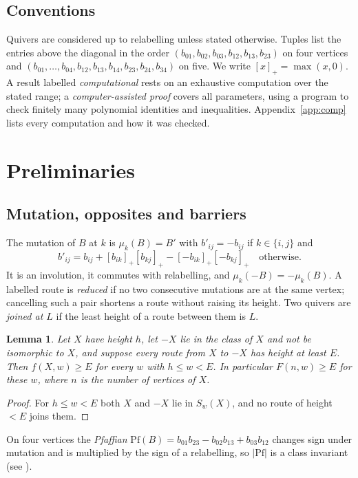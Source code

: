 \documentclass[11pt]{amsart}
\newtheorem{lemma}[theorem]{Lemma}
\theoremstyle{definition}
\theoremstyle{remark}
\newcommand{\pos}[1]{[#1]_+}
\begin{document}
\subsection{Conventions}\label{sec:conv}
Quivers are considered up to relabelling unless stated otherwise. Tuples list the entries above the diagonal in the order $(b_{01},b_{02},b_{03},b_{12},b_{13},b_{23})$ on four vertices and $(b_{01},\dots,b_{04},b_{12},b_{13},b_{14},b_{23},b_{24},b_{34})$ on five. We write $\pos{x}=\max(x,0)$. A result labelled \emph{computational} rests on an exhaustive computation over the stated range; a \emph{computer-assisted proof} covers all parameters, using a program to check finitely many polynomial identities and inequalities. Appendix~\ref{app:comp} lists every computation and how it was checked.

\section{Preliminaries}\label{sec:prelim}

\subsection{Mutation, opposites and barriers}
The mutation of $B$ at $k$ is $\mu_k(B)=B'$ with $b'_{ij}=-b_{ij}$ if $k\in\{i,j\}$ and
\[b'_{ij}=b_{ij}+\pos{b_{ik}}\pos{b_{kj}}-\pos{-b_{ik}}\pos{-b_{kj}}\quad\text{otherwise.}\]
It is an involution, it commutes with relabelling, and $\mu_k(-B)=-\mu_k(B)$. A labelled route is \emph{reduced} if no two consecutive mutations are at the same vertex; cancelling such a pair shortens a route without raising its height. Two quivers are \emph{joined at $L$} if the least height of a route between them is $L$.

\begin{lemma}\label{lem:escape}
Let $X$ have height $h$, let $-X$ lie in the class of $X$ and not be isomorphic to $X$, and suppose every route from $X$ to $-X$ has height at least $E$. Then $f(X,w)\ge E$ for every $w$ with $h\le w<E$. In particular $F(n,w)\ge E$ for these $w$, where $n$ is the number of vertices of $X$.
\end{lemma}
\begin{proof}
For $h\le w<E$ both $X$ and $-X$ lie in $S_w(X)$, and no route of height $<E$ joins them.
\end{proof}

On four vertices the \emph{Pfaffian} $\mathrm{Pf}(B)=b_{01}b_{23}-b_{02}b_{13}+b_{03}b_{12}$ changes sign under mutation and is multiplied by the sign of a relabelling, so $|\mathrm{Pf}|$ is a class invariant (see \cite[proof of Lemma~3.2]{BFZ}).
\end{document}
